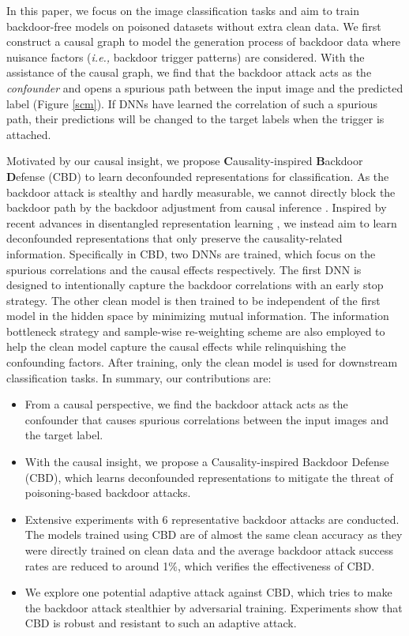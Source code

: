 In this paper, we focus on the image classification tasks and aim to train backdoor-free models on poisoned datasets without extra clean data. We first construct a causal graph to model the generation process of backdoor data where nuisance factors (\emph{i.e.,} backdoor trigger patterns) are considered. With the assistance of the causal graph, we find that the backdoor attack acts as the \emph{confounder} and opens a spurious path between the input image and the predicted label (Figure \ref{scm}). If DNNs have learned the correlation of such a spurious path, their predictions will be changed to the target labels when the trigger is attached.

Motivated by our causal insight, we propose {\bf C}ausality-inspired {\bf B}ackdoor {\bf D}efense (CBD) to learn deconfounded representations for classification. 
As the backdoor attack is stealthy and hardly measurable, we cannot directly block the backdoor path by the backdoor adjustment from causal inference \cite{causalinference}. Inspired by recent advances in disentangled representation learning \cite{wang2020cross, hamaguchi2019rare, liu2021mitigating}, we instead aim to learn deconfounded representations that only preserve the causality-related information. Specifically in CBD, two DNNs are trained, which focus on the spurious correlations and the causal effects respectively. The first DNN is designed to intentionally capture the backdoor correlations with an early stop strategy. The other clean model is then trained to be independent of the first model in the hidden space by minimizing mutual information. The information bottleneck strategy and sample-wise re-weighting scheme are also employed to help the clean model capture the causal effects while relinquishing the confounding factors.
After training, only the clean model is used for downstream classification tasks.
In summary, our contributions are:
\begin{itemize}
    \item From a causal perspective, we find the backdoor attack acts as the confounder that causes spurious correlations between the input images and the target label.
    \item With the causal insight, we propose a Causality-inspired Backdoor Defense (CBD), which learns deconfounded representations to mitigate the threat of poisoning-based backdoor attacks.
    \item Extensive experiments with 6 representative backdoor attacks are conducted. The models trained using CBD are of almost the same clean accuracy as they were directly trained on clean data and the average backdoor attack success rates are reduced to around 1$\%$, which verifies the effectiveness of CBD.
    \item We explore one potential adaptive attack against CBD, which tries to make the backdoor attack stealthier by adversarial training. Experiments show that CBD is robust and resistant to such an adaptive attack.
\end{itemize}

